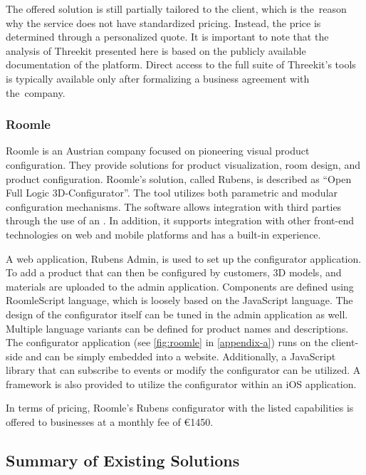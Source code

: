 The offered solution is still partially tailored to the client, which is the~reason why the service does not have standardized pricing. Instead, the price is determined through a personalized quote. It is important to note that the analysis of Threekit presented here is based on the publicly available documentation of the platform. Direct access to the full suite of Threekit's tools is typically available only after formalizing a business agreement with the~company.


\subsubsection{Roomle}

Roomle is an Austrian company focused on pioneering visual product configuration. They provide solutions for product visualization, room design, and product configuration. Roomle's solution, called Rubens, is described as \enquote{Open Full Logic 3D-Configurator}. The tool utilizes both parametric and modular configuration mechanisms. The software allows integration with third parties through the use of an . In addition, it supports integration with other front-end technologies on web and mobile platforms and has a built-in  experience.~\cite{RoomleAbout}

A web application, Rubens Admin, is used to set up the configurator application. To add a product that can then be configured by customers, 3D models, and materials are uploaded to the admin application. Components are defined using RoomleScript language, which is loosely based on the JavaScript language. The design of the configurator itself can be tuned in the admin application as well. Multiple language variants can be defined for product names and descriptions. The configurator application (see \autoref{fig:roomle} in \autoref{appendix-a}) runs on the client-side and can be simply embedded into a website. Additionally, a JavaScript library that can subscribe to events or modify the configurator can be utilized. A framework is also provided to utilize the configurator within an iOS application.~\cite{RoomleDocumentation}

In terms of pricing, Roomle's Rubens configurator with the listed capabilities is offered to businesses at a monthly fee of €1450.~\cite{RoomleFullLogic}

\subsection{Summary of Existing Solutions}

